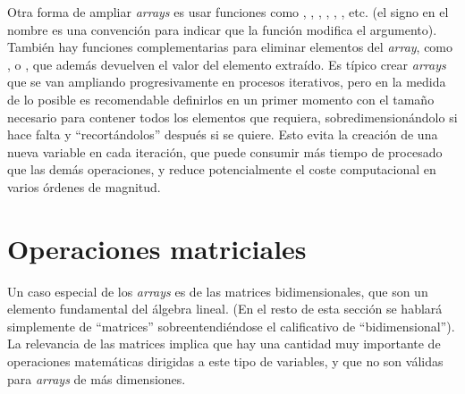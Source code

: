 Otra forma de ampliar \emph{arrays} es usar funciones como , , , , , , etc. (el signo \code{!} en el nombre es una convención para indicar que la función modifica el argumento). También hay funciones complementarias para eliminar elementos del \emph{array}, como ,  o , que además devuelven el valor del elemento extraído. Es típico crear \emph{arrays} que se van ampliando progresivamente en procesos iterativos, pero en la medida de lo posible es recomendable definirlos en un primer momento con el tamaño necesario para contener todos los elementos que requiera, sobredimensionándolo si hace falta y ``recortándolos'' después si se quiere. Esto evita la creación de una nueva variable en cada iteración, que puede consumir más tiempo de procesado que las demás operaciones, y reduce potencialmente el coste computacional en varios órdenes de magnitud.

\section{Operaciones matriciales}

Un caso especial de los \emph{arrays} es de las matrices bidimensionales, que son un elemento fundamental del álgebra lineal. (En el resto de esta sección se hablará simplemente de ``matrices'' sobreentendiéndose el calificativo de ``bidimensional''). La relevancia de las matrices implica que hay una cantidad muy importante de operaciones matemáticas dirigidas a este tipo de variables, y que no son válidas para \emph{arrays} de más dimensiones.

